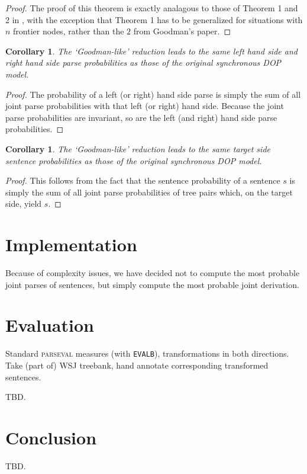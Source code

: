 \documentclass[a4paper]{article}
\newtheorem{corollary}[theorem]{Corollary}
\theoremstyle{definition}
\begin{document}
\begin{proof}
The proof of this theorem is exactly analagous to those of Theorem 1 and 2 in \citet{goodman2003efficient}, with the exception that Theorem 1 has to be generalized for
situations with $n$ frontier nodes, rather than the $2$ from Goodman's paper.
\end{proof}

\begin{corollary}
The `Goodman-like' reduction leads to the same left hand side and right hand side parse probabilities as those of the original synchronous DOP model.
\end{corollary}

\begin{proof}
The probability of a left (or right) hand side parse is simply the sum of all joint parse
probabilities with that left (or right) hand side. Because the joint parse probabilities are invariant, so are the left (and right) hand side parse probabilities.
\end{proof}

\begin{corollary}
The `Goodman-like' reduction leads to the same target side sentence probabilities as those of the original synchronous DOP model.
\end{corollary}

\begin{proof}
This follows from the fact that the sentence probability of a sentence $s$ is simply the sum of all joint parse probabilities of tree pairs which, on the target side, yield $s$.
\end{proof}

\section{Implementation}

Because of complexity issues, we have decided not to compute the most probable joint parses of sentences, but simply compute the most probable joint derivation.

\label{sec:implem}

\section{Evaluation}
\label{sec:eval}

Standard \textsc{parseval} measures (with \texttt{EVALB}), transformations in both
directions. Take (part of) WSJ treebank, hand annotate corresponding transformed
sentences.

TBD. 

\section{Conclusion}

TBD.

\label{sec:conc}


%


\end{document}
